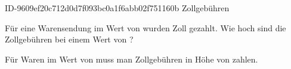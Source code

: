 \begin{exercise}
      {ID-9609ef20c712d0d7f093bc0a1f6abb02f751160b}
      {Zollgebühren}
  \ifproblem\problem\par
    Für eine Warensendung im Wert von  wurden  Zoll gezahlt.
    Wie hoch sind die Zollgebühren bei einem Wert von ?
  \fi
  \ifoutcome\outcome\par
    Für Waren im Wert von  muss man Zollgebühren in Höhe von  zahlen.
  \fi
\end{exercise}
